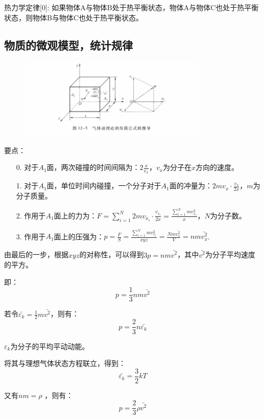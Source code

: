 \documentclass[10pt]{ctexart}
\begin{document}
热力学定律[0]: 如果物体A与物体B处于热平衡状态，物体A与物体C也处于热平衡状态，则物体B与物体C也处于热平衡状态。

\subsection{物质的微观模型，统计规律}

\begin{figure}[H]
    \centering
    \includegraphics[width=0.8\textwidth]{img/12/1.png}
\end{figure}

要点：
\begin{itemize}
    \item [0.] 对于$A_1$面，两次碰撞的时间间隔为：$2 \frac{x}{v_x}$，$v_x$为分子在$x$方向的速度。
    \item [1.] 对于$A_1$面，单位时间内碰撞，一个分子对于$A_1$面的冲量为：$2 m v_x \cdot \frac{v_x}{2 x}$，$m$为分子质量。
    \item [2.] 作用于$A_1$面上的力为：$F = \sum_{i=1}^{N} 2 m v_{x_i} \cdot \frac{v_{x_i}}{2 x} = \frac{\sum_{i=1}^{N} m v_{x_i}^2 }{x}$，$N$为分子数。
    \item [3.] 作用于$A_1$面上的压强为：$p = \frac{F}{S} = \frac{\sum_{i=1}^{N} m v_{x_i}^2}{xyz} = \frac{Nm\bar{v_x^2}}{V} = n m \bar{v_x^2}$.
\end{itemize}

由最后的一步，根据$x y z$的对称性，可以得到$3 p = n m \bar{v^2}$，其中$\bar{v^2}$为分子平均速度的平方。

即：
$$
    p = \frac{1}{3} n m \bar{v^2}
$$

若令$\bar{\varepsilon_k} = \frac{1}{2} m \bar{v^2}$，则有：
$$
    p = \frac{2}{3} n \bar{\varepsilon_k}
$$

$\varepsilon_k$为分子的平均平动动能。

将其与理想气体状态方程联立，得到：
$$
    \bar{\varepsilon_k} = \frac{3}{2} k T
$$

又有$ n m = \rho $ ，则有：
$$
    p = \frac{2}{3} \rho \bar{v^2}
$$
\end{document}
